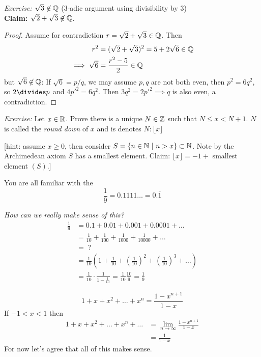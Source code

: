 \documentclass[twoside]{scrartcl}
\begin{document}
\emph{Exercise:} $\sqrt{3} \not \in \mathbb{Q}$ ($3$-adic argument using divisibility by $3$)\\

\textbf{Claim:} $\sqrt{2} + \sqrt{3} \not \in \mathbb{Q}$. 
\begin{proof}
	Assume for contradiction $r = \sqrt{2} + \sqrt{3} \in \mathbb{Q}$. Then 
	\[
\begin{aligned}
  r^2 &= (\sqrt{2} + \sqrt{3})^2 = 5 + 2\sqrt{6} \in \mathbb{Q}\\
  \implies \sqrt{6} &= \frac{r^2-5}{2} \in \mathbb{Q} 
\end{aligned}
\]
but $\sqrt{6} \not \in \mathbb{Q}$: If $\sqrt{6} = p/q$, we may assume $p,q$ are not both even, then $p^2 = 6q^2$, so $2 \divides p$ and $4p'^2 = 6q^2$. Then $3q^2 = 2p'^2 \implies q$ is also even, a contradiction. 
\end{proof}

\emph{Exercise:} Let $x \in\mathbb{R}$. Prove there is a unique $N \in \mathbb{Z}$ such that $N \leq x < N+1$. $N$ is called the \emph{round down} of $x$ and is denotes $N: \lfloor x \rfloor$

[hint: assume $x \geq 0$, then  consider $S = \{n \in\mathbb{N} ~|~ n > x\} \subset \mathbb{N}$. Note by the Archimedean axiom $S$ has a smallest element. Claim: $\lfloor x \rfloor = -1 + $ smallest element $(S)$.]


You are all familiar with the
\[\frac{1}{9} = 0.1111\dots = 0.\overline{1}\]\vspace*{5pt}

\emph{How can we really make sense of this?}
\[
\begin{aligned}
  \frac{1}{9} &= 0.1 + 0.01 + 0.001 + 0.0001 + \dots\\
  &= \frac{1}{10} + \frac{1}{100} + \frac{1}{1000} + \frac{1}{10000} + \dots\\
  &= \; ? \\
  &= \frac{1}{10}\left(1 + \frac{1}{10} + \left(\frac{1}{10}\right)^2 + \left(\frac{1}{10}\right)^3 + \dots \right)\\ 
  &= \frac{1}{10} \cdot\frac{1}{1-\frac{1}{10}} = \frac{1}{10}\frac{10}{9} = \frac{1}{9}
\end{aligned}
\]\vspace*{5pt}

\begin{remark}
\[1 + x + x^2 + \dots + x^n = \frac{1-x^{n+1}}{1-x}\]
If $-1 < x < 1$ then 
\[
\begin{aligned}
  1 + x + x^2 + \dots + x^n + \dots &= \lim_{n\to \infty}\frac{1-x^{n+1}}{1-x}\\
  &= \frac{1}{1-x}
\end{aligned}
\]
For now let's agree that all of this makes sense. 
\end{remark}
\end{document}
